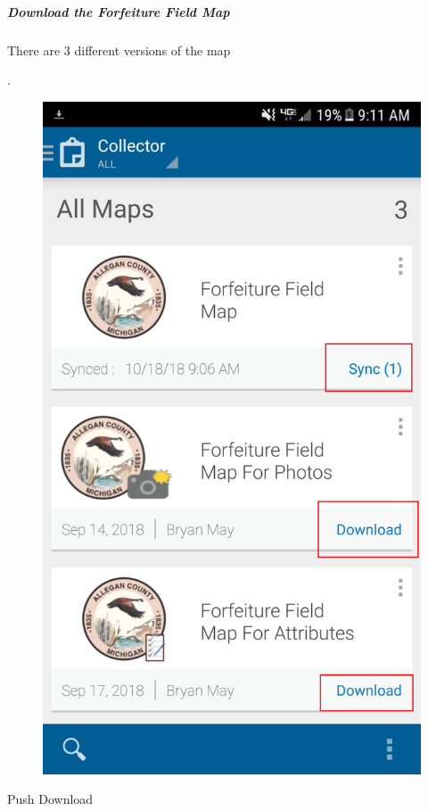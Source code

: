 \documentclass[letterpaper, 12pt]{memoir}
\begin{document}
\subparagraph{Download the Forfeiture Field Map}There are 3 different versions of the map

.%
\begin{figure}
\includegraphics[width=.5\textwidth]{CollectorChooseMap.png}
\end{figure}
\vspace{3in}

Push Download
\end{document}
